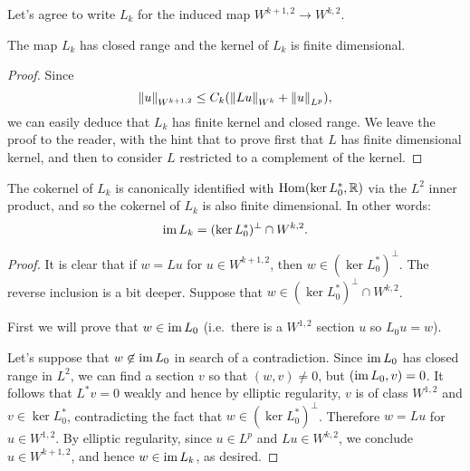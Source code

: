 \documentclass{amsart}
\begin{document}
 Let's agree to write $L_{k}$ for the induced map $W^{k+1,2}\to
   W^{k,2}$.
 \begin{lemma}
   The map $L_{k}$ has closed range and the kernel of $L_{k}$ is finite dimensional.
 \end{lemma}
 \begin{proof}
   Since
   \begin{equation*}
     \left\lVert u\right\rVert_{W^{k+1,2}}\le C_{k}(\left\lVert Lu\right\rVert_{W^{k}}+\left\lVert u\right\rVert_{L^{p}}),
   \end{equation*}
   we can easily deduce that $L_{k}$ has finite kernel and closed
   range. We leave the proof to the reader, with the hint that to
   prove first that $L$ has finite dimensional kernel, and then to
   consider $L$ restricted to a complement of the kernel.
 \end{proof}
 
 \begin{lemma}
   The cokernel of $L_{k}$ is
   canonically identified with $\operatorname{\mathrm{Hom}}(\ker L^{*}_{0},\mathbb{R})$ via the $L^{2}$
   inner product, and so the cokernel of $L_{k}$ is also finite
   dimensional. In other words:
   \begin{equation*}
     \operatorname{\mathrm{im}} L_{k}=(\ker L^{*}_{0})^{\perp}\cap W^{k,2}.
   \end{equation*}
 \end{lemma}
 \begin{proof}
   It is clear that if $w=Lu$ for $u\in W^{k+1,2}$, then $w\in (\ker
   L^{*}_{0})^{\perp}$. The reverse inclusion is a bit deeper. Suppose
   that $w\in (\ker L^{*}_{0})^{\perp}\cap W^{k,2}$.

   First we will prove that $w\in \operatorname{\mathrm{im}} L_{0}$ (i.e.\ there is a
   $W^{1,2}$ section $u$ so $L_{0}u=w$). 

   Let's suppose that $w\not\in \operatorname{\mathrm{im}} L_{0}$ in search of a
   contradiction. Since $\operatorname{\mathrm{im}} L_{0}$ has closed range in $L^{2}$, we
   can find a section $v$ so that $(w,v)\ne 0$, but $(\operatorname{\mathrm{im}}
   L_{0},v)=0$. It follows that $L^{*}v=0$ weakly and hence by
   elliptic regularity, $v$ is of class $W^{1,2}$ and
   $v\in \ker L^{*}_{0}$, contradicting the fact that $w\in (\ker
   L_{0}^{*})^{\perp}$. Therefore $w=Lu$ for $u\in W^{1,2}$. By
   elliptic regularity, since $u\in L^{p}$ and $Lu\in W^{k,2}$, we
   conclude $u\in W^{k+1,2}$, and hence $w\in \operatorname{\mathrm{im}} L_{k}$, as desired.   
 \end{proof}
 
\end{document}
